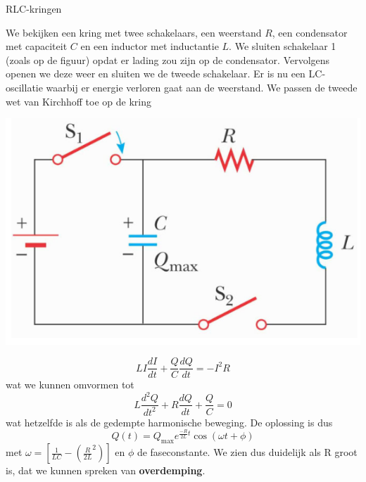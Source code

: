 \begin{app}{RLC-kringen}
    \vspace{-0.5cm}
    \begin{minipage}{.73\textwidth}
        \vspace{0.2cm}
        We bekijken een kring met twee schakelaars, een weerstand $R$, een condensator met capaciteit $C$ en een inductor
        met inductantie $L$. We sluiten schakelaar 1 (zoals op de figuur) opdat er lading zou zijn op de condensator. 
        Vervolgens openen we deze weer en sluiten we de tweede schakelaar. Er is nu een LC-oscillatie waarbij er energie verloren gaat aan de weerstand.
        We passen de tweede wet van Kirchhoff toe op de kring
    \end{minipage}
    \begin{minipage}{.23\textwidth}
        \vspace{0.3cm}\includegraphics[scale = 0.45]{Images/Magnetisme/RLCKring}
    \end{minipage}
    \vspace{-0.25cm}
    \begin{equation*}
        LI\frac{dI}{dt} + \dfrac{Q}{C}\dfrac{dQ}{dt} = -I^2R
    \end{equation*}
    wat we kunnen omvormen tot
    \begin{equation*}
        L\frac{d^2Q}{dt^2} + R\dfrac{dQ}{dt} + \dfrac{Q}{C} = 0
    \end{equation*}
    wat hetzelfde is als de gedempte harmonische beweging. De oplossing is dus
    \begin{equation*}
        Q(t) = Q_{\max}e^{\frac{-R}{2L}t}\cos(\omega t + \phi)
    \end{equation*}
    met $\omega = \left[\tfrac{1}{LC} - (\tfrac{R}{2L}^2)\right]$ en $\phi$ de faseconstante. We zien dus duidelijk als R groot is,
    dat we kunnen spreken van \textbf{overdemping}.
\end{app}

